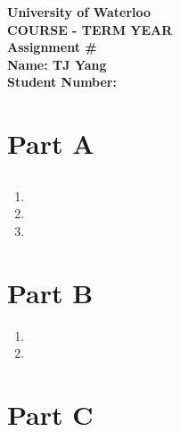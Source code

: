 \documentclass[12pt]{article}
\begin{document}
\begin{center}
{\Large\bf University of Waterloo}\\
\vspace{3mm}
{\Large\bf COURSE - TERM YEAR}\\
\vspace{2mm}
{\Large\bf Assignment \#}\\
\vspace{3mm}
\textbf{Name: TJ Yang}\\
\textbf{Student Number:}
\end{center}

\section*{Part A}
\subsection{}
\begin{enumerate}[label=(\alph*)]
  \item
  \item
  \item
\end{enumerate}
\section*{Part B}
\begin{enumerate}
  \item
  \item
\end{enumerate}
\section*{Part C}
\end{document}
